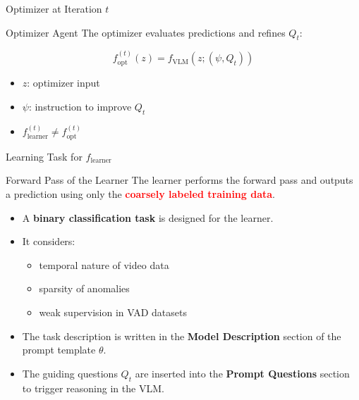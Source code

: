 \documentclass[aspectratio=169,xcolor=dvipsnames]{beamer}
\begin{document}
	\begin{frame}{Optimizer at Iteration \(t\)}
		\small
		\begin{block}{Optimizer Agent}
			The optimizer evaluates predictions and refines \(Q_t\):
			
			\[
			f^{(t)}_{\text{opt}}(z)
			=
			f_{\text{VLM}}(z; (\psi, Q_t))
			\]
			
			\begin{itemize}
				\item \(z\): optimizer input
				\item \(\psi\): instruction to improve \(Q_t\)
				\item \textbf{\(f^{(t)}_{\text{learner}} \neq f^{(t)}_{\text{opt}}\)}
			\end{itemize}
			
		\end{block}
		
		
	\end{frame}
	
	\begin{frame}{Learning Task for \(f_{\text{learner}}\)}
		\small
		
		\begin{block}{Forward Pass of the Learner}
			The learner performs the forward pass and outputs a prediction
			using only the \textbf{\textcolor{red}{coarsely labeled training data}}.
		\end{block}
		
		\begin{itemize}
			\item A \textbf{binary classification task} is designed for the learner.
			\item It considers:
			\begin{itemize}
				\item temporal nature of video data
				\item sparsity of anomalies
				\item weak supervision in VAD datasets
			\end{itemize}
		\end{itemize}
		
		
		\begin{itemize}
			\item The task description is written in the \textbf{Model Description} section of the prompt template \(\theta\).
			\item The guiding questions \(Q_t\) are inserted into the \textbf{Prompt Questions} section to trigger reasoning in the VLM.
		\end{itemize}
		
	\end{frame}
	
\end{document}
